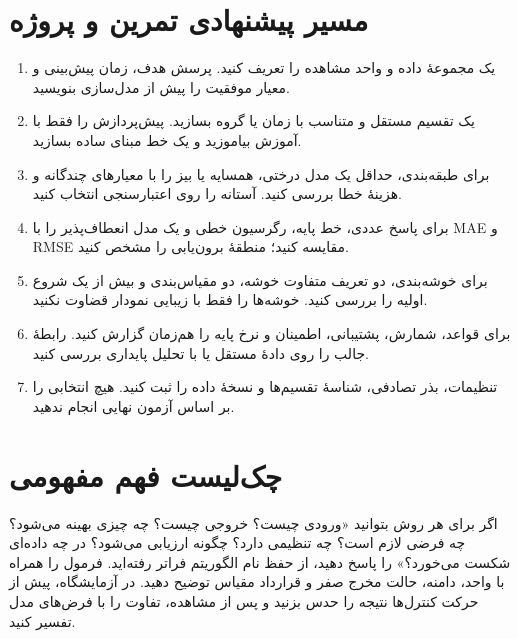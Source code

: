 \section{مسیر پیشنهادی تمرین و پروژه}
\begin{enumerate}
\item یک مجموعهٔ داده و واحد مشاهده را تعریف کنید. پرسش هدف، زمان پیش‌بینی و معیار موفقیت را پیش از مدل‌سازی بنویسید.
\item یک تقسیم مستقل و متناسب با زمان یا گروه بسازید. پیش‌پردازش را فقط با آموزش بیاموزید و یک خط مبنای ساده بسازید.
\item برای طبقه‌بندی، حداقل یک مدل درختی، همسایه یا بیز را با معیارهای چندگانه و هزینهٔ خطا بررسی کنید. آستانه را روی اعتبارسنجی انتخاب کنید.
\item برای پاسخ عددی، خط پایه، رگرسیون خطی و یک مدل انعطاف‌پذیر را با MAE و RMSE مقایسه کنید؛ منطقهٔ برون‌یابی را مشخص کنید.
\item برای خوشه‌بندی، دو تعریف متفاوت خوشه، دو مقیاس‌بندی و بیش از یک شروع اولیه را بررسی کنید. خوشه‌ها را فقط با زیبایی نمودار قضاوت نکنید.
\item برای قواعد، شمارش، پشتیبانی، اطمینان و نرخ پایه را هم‌زمان گزارش کنید. رابطهٔ جالب را روی دادهٔ مستقل یا با تحلیل پایداری بررسی کنید.
\item تنظیمات، بذر تصادفی، شناسهٔ تقسیم‌ها و نسخهٔ داده را ثبت کنید. هیچ انتخابی را بر اساس آزمون نهایی انجام ندهید.
\end{enumerate}

\section{چک‌لیست فهم مفهومی}
اگر برای هر روش بتوانید «ورودی چیست؟ خروجی چیست؟ چه چیزی بهینه می‌شود؟ چه فرضی لازم است؟ چه تنظیمی دارد؟ چگونه ارزیابی می‌شود؟ در چه داده‌ای شکست می‌خورد؟» را پاسخ دهید، از حفظ نام الگوریتم فراتر رفته‌اید. فرمول را همراه با واحد، دامنه، حالت مخرج صفر و قرارداد مقیاس توضیح دهید. در آزمایشگاه، پیش از حرکت کنترل‌ها نتیجه را حدس بزنید و پس از مشاهده، تفاوت را با فرض‌های مدل تفسیر کنید.
